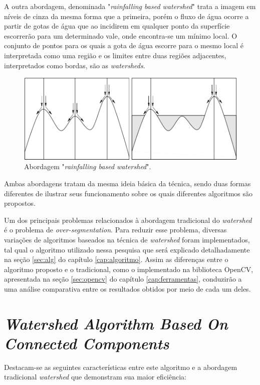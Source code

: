 A outra abordagem, denominada "\textit{rainfalling based watershed}" trata a imagem em níveis de cinza da mesma forma que a primeira, porém o fluxo de água ocorre a partir de gotas de água que ao incidirem em qualquer ponto da superfície escorrerão para um determinado vale, onde encontra-se um mínimo local. O conjunto de pontos para os quais a gota de água escorre para o mesmo local é interpretada como uma região e os limites entre duas regiões adjacentes,  interpretados como bordas, são as \textit{watersheds}. \citep{l6} 

	\begin{figure}[!htb]
       \begin{center}  
          \includegraphics[width=0.6\columnwidth]{img/abordagem_rainfalling.jpg}
           \caption{\label{fig:abordagem_rainfalling}Abordagem "\textit{rainfalling based watershed}". \cite{ruparelia2012implementation}}
       \end{center}
   \end{figure} 
	

Ambas abordagens tratam da mesma ideia básica da técnica, sendo duas formas diferentes de ilustrar seus funcionamento sobre os quais diferentes algoritmos são propostos.

Um dos principais problemas relacionados à abordagem tradicional do \textit{watershed} é o problema de \textit{over-segmentation}. Para reduzir esse problema, diversas variações de algoritmos baseados na técnica de \textit{watershed} foram implementados, tal qual o algoritmo utilizado nessa pesquisa que será explicado detalhadamente na seção \ref{sec:alg} do capítulo \ref{cap:algoritmo}. Assim as diferenças entre o algoritmo proposto e o tradicional, como o implementado na biblioteca OpenCV, apresentada na seção \ref{sec:opencv} do capítulo \ref{cap:ferramentas}, conduzirão a uma análise comparativa entre os resultados obtidos por meio de cada um deles.

\section{\textit{Watershed Algorithm Based On Connected Components}}
Destacam-se as seguintes características entre este algoritmo e a abordagem tradicional \textit{watershed} que demonstram sua maior eficiência:

